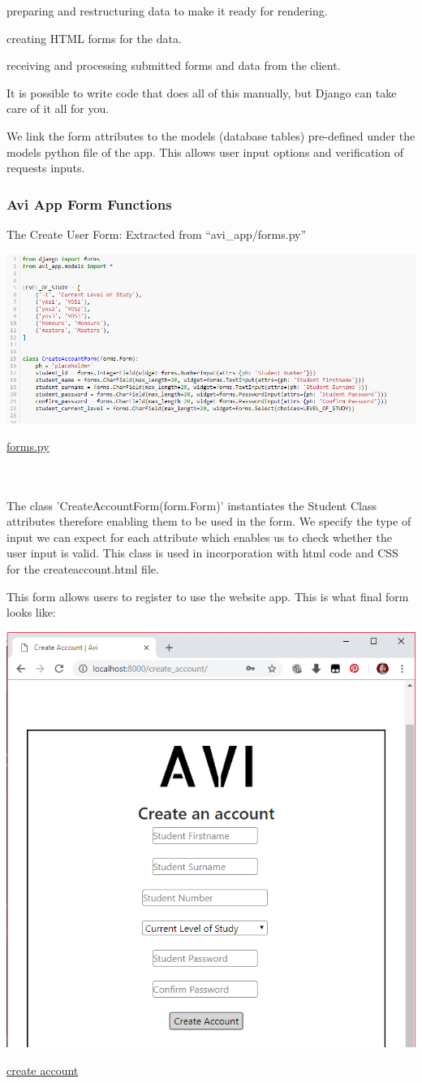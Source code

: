 \documentclass[10pt]{article}
\begin{document}
\begin{description}[font=$\bullet$~\normalfont\scshape\color{red!50!black}]
\item [] preparing and restructuring data to make it ready for rendering.
\item [] creating HTML forms for the data.
\item [] receiving and processing submitted forms and data from the client.
\end{description}

It is possible to write code that does all of this manually, but Django can take care of it all for you.

We link the form attributes to the models (database tables) pre-defined under the models python file of the app. This allows user input options and verification of requests inputs.

\subsubsection{Avi App Form Functions}
The Create User Form: Extracted from “avi\_app/forms.py”

\begin{center}
\includegraphics[width=.9\textwidth]{forms.png}
\end{center}
\caption{\underline{forms.py}} \\ \\

The class ’CreateAccountForm(form.Form)’ instantiates the Student Class attributes therefore enabling them to be used in the form. We specify the type of input we can expect for each attribute which enables us to check whether the user input is valid. This class is used in incorporation with html code and CSS for the createaccount.html file. 

This form allows users to register to use the website app. This is what final form looks like:

\begin{center}
\includegraphics[width=.4\textwidth]{create_A.png}
\end{center}
\caption{\underline{create account}}
\end{document}
